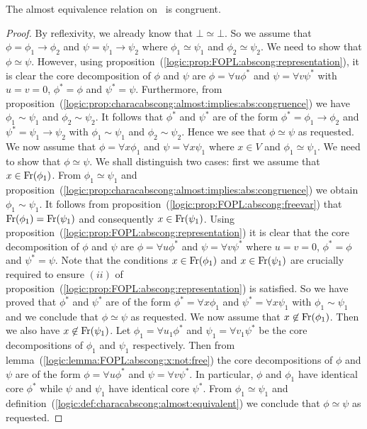 \begin{prop}\label{logic:prop:characabscong:almost:congruent}
The almost equivalence relation on \pv\ is congruent.
\end{prop}
\begin{proof}
By reflexivity, we already know that $\bot\simeq\bot$. So we assume
that $\phi=\phi_{1}\to\phi_{2}$ and $\psi=\psi_{1}\to\psi_{2}$ where
$\phi_{1}\simeq\psi_{1}$ and $\phi_{2}\simeq\psi_{2}$. We need to
show that $\phi\simeq\psi$. However, using
proposition~(\ref{logic:prop:FOPL:abscong:representation}), it is
clear the core decomposition of $\phi$ and $\psi$ are $\phi=\forall
u\phi^{*}$ and $\psi=\forall v\psi^{*}$ with $u=v=0$,
$\phi^{*}=\phi$ and $\psi^{*}=\psi$. Furthermore, from
proposition~(\ref{logic:prop:characabscong:almost:implies:abs:congruence})
we have $\phi_{1}\sim\psi_{1}$ and $\phi_{2}\sim\psi_{2}$. It
follows that $\phi^{*}$ and $\psi^{*}$ are of the form
$\phi^{*}=\phi_{1}\to\phi_{2}$ and $\psi^{*}=\psi_{1}\to\psi_{2}$
with $\phi_{1}\sim\psi_{1}$ and $\phi_{2}\sim\psi_{2}$. Hence we see
that $\phi\simeq\psi$ as requested. We now assume that $\phi=\forall
x\phi_{1}$ and $\psi=\forall x\psi_{1}$ where $x\in V$ and
$\phi_{1}\simeq\psi_{1}$. We need to show that $\phi\simeq\psi$. We
shall distinguish two cases: first we assume that
$x\in\mbox{\rm Fr}(\phi_{1})$. From $\phi_{1}\simeq\psi_{1}$ and
proposition~(\ref{logic:prop:characabscong:almost:implies:abs:congruence})
we obtain $\phi_{1}\sim\psi_{1}$. It follows from
proposition~(\ref{logic:prop:FOPL:abscong:freevar}) that
$\mbox{\rm Fr}(\phi_{1})=\mbox{\rm Fr}(\psi_{1})$ and consequently
$x\in\mbox{\rm Fr}(\psi_{1})$. Using
proposition~(\ref{logic:prop:FOPL:abscong:representation}) it is
clear that the core decomposition of $\phi$ and $\psi$ are
$\phi=\forall u\phi^{*}$ and $\psi=\forall v\psi^{*}$ where $u=v=0$,
$\phi^{*}=\phi$ and $\psi^{*}=\psi$. Note that the conditions
$x\in\mbox{\rm Fr}(\phi_{1})$ and $x\in\mbox{\rm Fr}(\psi_{1})$ are crucially
required to ensure $(ii)$ of
proposition~(\ref{logic:prop:FOPL:abscong:representation}) is
satisfied. So we have proved that $\phi^{*}$ and $\psi^{*}$ are of
the form $\phi^{*}=\forall x\phi_{1}$ and $\psi^{*}=\forall
x\psi_{1}$ with $\phi_{1}\sim\psi_{1}$ and we conclude that
$\phi\simeq\psi$ as requested. We now assume that
$x\not\in\mbox{\rm Fr}(\phi_{1})$. Then we also have
$x\not\in\mbox{\rm Fr}(\psi_{1})$. Let $\phi_{1}=\forall u_{1}\phi^{*}$ and
$\psi_{1}=\forall v_{1}\psi^{*}$ be the core decompositions of
$\phi_{1}$ and $\psi_{1}$ respectively. Then from
lemma~(\ref{logic:lemma:FOPL:abscong:x:not:free}) the core
decompositions of $\phi$ and $\psi$ are of the form $\phi=\forall
u\phi^{*}$ and $\psi=\forall v\psi^{*}$. In particular, $\phi$ and
$\phi_{1}$ have identical core $\phi^{*}$ while $\psi$ and
$\psi_{1}$ have identical core $\psi^{*}$. From
$\phi_{1}\simeq\psi_{1}$ and
definition~(\ref{logic:def:characabscong:almost:equivalent}) we
conclude that $\phi\simeq\psi$ as requested.
\end{proof}

